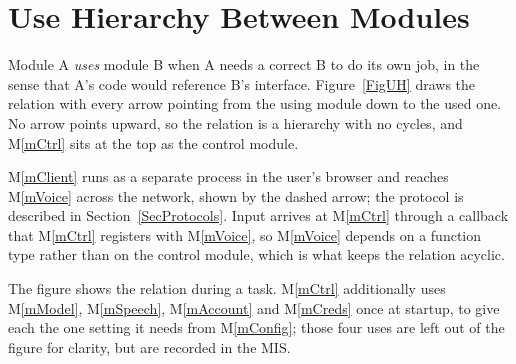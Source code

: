 \documentclass[12pt, titlepage]{article}
\newcommand{\mref}[1]{M\ref{#1}}
\begin{document}
\section{Use Hierarchy Between Modules} \label{SecUse}

Module A \emph{uses} module B when A needs a correct B to do its own job, in the
sense that A's code would reference B's interface. Figure~\ref{FigUH} draws the
relation with every arrow pointing from the using module down to the used one.
No arrow points upward, so the relation is a hierarchy with no cycles, and
\mref{mCtrl} sits at the top as the control module.

\mref{mClient} runs as a separate process in the user's browser and reaches
\mref{mVoice} across the network, shown by the dashed arrow; the protocol is
described in Section~\ref{SecProtocols}. Input arrives at \mref{mCtrl} through a
callback that \mref{mCtrl} registers with \mref{mVoice}, so \mref{mVoice} depends
on a function type rather than on the control module, which is what keeps the
relation acyclic.

The figure shows the relation during a task. \mref{mCtrl} additionally uses
\mref{mModel}, \mref{mSpeech}, \mref{mAccount} and \mref{mCreds} once at startup,
to give each the one setting it needs from \mref{mConfig}; those four uses are
left out of the figure for clarity, but are recorded in the MIS.
\end{document}
